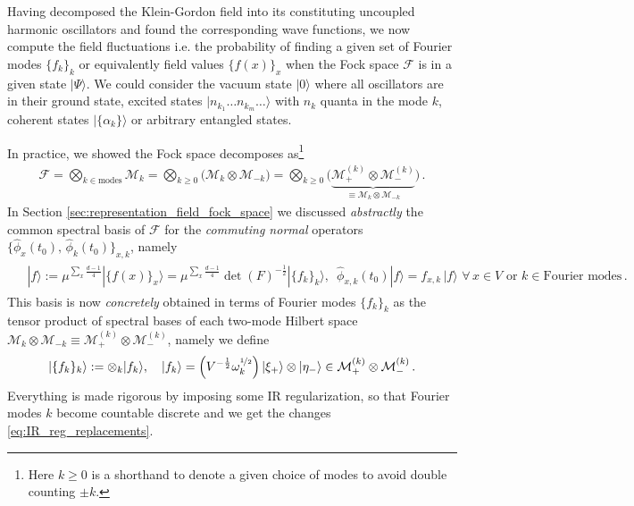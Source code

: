 \documentclass[../QFT_main.tex]{subfiles}
\begin{document}
\begin{mytheorem}
%
Having decomposed the Klein-Gordon field into its constituting uncoupled harmonic oscillators and found the corresponding wave functions, we now compute the field fluctuations i.e. the probability of finding a given set of Fourier modes $\{f_k\}_k$ or equivalently field values $\{f(x)\}_x$ when the Fock space $\mathcal{F}$ is in a given state $|\Psi\rangle$.
%
We could consider the vacuum state $|0\rangle$ where all oscillators are in their ground state, excited states $|n_{k_1}\dots n_{k_m}\dots \rangle$ with $n_k$ quanta in the mode $k$, coherent states $|\{\alpha_k\}\rangle$ or arbitrary entangled states.

In practice, we showed the Fock space decomposes as\footnote{Here $k\geq0$ is a shorthand to denote a given choice of modes to avoid double counting $\pm k$.}
\begin{align}
    \mathcal{F}= \bigotimes_{k\in\mathrm{modes}}\!\!\!\mathcal{M}_k = \bigotimes_{k\geq 0}\Big(\mathcal{M}_k\otimes\mathcal{M}_{-k}\Big)
    =\bigotimes_{k\geq 0}\Big(\underbrace{\mathcal{M}^{(k)}_+\otimes\mathcal{M}^{(k)}_-}_{\equiv \mathcal{M}_k\otimes\mathcal{M}_{-k}}\Big)\,.
\end{align}
In Section \ref{sec:representation_field_fock_space} we discussed \emph{abstractly} the common spectral basis of $\mathcal{F}$ for the \emph{commuting normal} operators $\big\{\hat{\phi}_x(t_0),\,\hat{\phi}_k(t_0)\big\}_{x,k}$, namely
\begin{align}
\begin{aligned}
    &|f\rangle := \mu^{\underset{x}{\sum}\frac{d-1}{4}} |\{f(x)\}_x \rangle = \mu^{\underset{x}{\sum}\frac{d-1}{4}}\!\! \det(F)^{-\frac{1}{2}} |\{f_k\}_k \rangle,\,\,\, \hat{\phi}_{x,k}(t_0) |f\rangle = f_{x,k} \,|f\rangle\,\, \forall\, x\in V \text{ or } k\in\text{Fourier modes}\,.
\end{aligned}
\end{align}
This basis is now \emph{concretely} obtained in terms of Fourier modes $\{f_k\}_k$ as the tensor product of spectral bases of each two-mode Hilbert space $\mathcal{M}_k\otimes \mathcal{M}_{-k}\equiv \mathcal{M}_+^{(k)}\otimes \mathcal{M}_{-}^{(k)}$, namely we define
\begin{align}
    |\{f_k\}_k\rangle := \otimes_k |f_k\rangle, \quad |f_k\rangle = \Big(V^{-\frac{1}{2}}\omega_k^{\nicefrac{1}{2}}\Big)\, |\xi_+\rangle \otimes |\eta_-\rangle \in \mathcal{M}_+^{(k)}\otimes \mathcal{M}_{-}^{(k)}\,.
\end{align}
%
Everything is made rigorous by imposing some IR regularization, so that Fourier modes $k$ become countable discrete and we get the changes \eqref{eq:IR_reg_replacements}.


\end{mytheorem}
\end{document}
